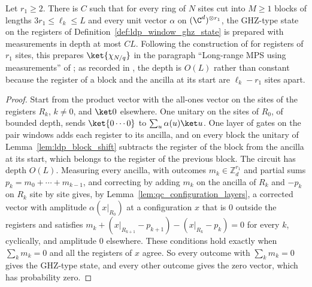 \begin{lemma}
    \label{thm:ldp_window_ghz_measurement}
    \leanok
    Let $r_1\geq2$. There is $C$ such that for every ring of $N$ sites cut into
    $M\geq1$ blocks of lengths $3r_1\leq\ell_k\leq L$ and every unit vector
    $\alpha$ on $(\C^d)^{\otimes r_1}$, the GHZ-type state on the registers of
    Definition~\ref{def:ldp_window_ghz_state} is prepared with measurements in
    depth at most $CL$. Following the construction of
    \cite[Example~1]{Piroli2021LOCC} for registers of $r_1$ sites, this prepares
    $\ket{\chi_{N/q}}$ in the paragraph ``Long-range MPS using measurements'' of
    \cite{Malz2024Preparation}; as recorded in
    \cite{gap:mswc24_measurement_preparation_scope}, the depth is $O(L)$ rather
    than constant because the register of a block and the ancilla at its start
    are $\ell_k-r_1$ sites apart.
\end{lemma}
\begin{proof}
    \leanok
    Start from the product vector with the all-ones vector on the sites of the
    registers $R_k$, $k\neq0$, and $\ket0$ elsewhere. One unitary on the sites
    of $R_0$, of bounded depth, sends $\ket{0\cdots0}$ to $\sum_u\alpha(u)\ket u$.
    One layer of gates on the pair windows adds each register to its ancilla,
    and on every block the unitary of Lemma~\ref{lem:ldp_block_shift} subtracts
    the register of the block from the ancilla at its start, which belongs to the
    register of the previous block. The circuit has depth $O(L)$. Measuring every
    ancilla, with outcomes $m_k\in\mathbb Z_d^{r_1}$ and partial sums
    $p_k=m_0+\cdots+m_{k-1}$, and correcting by adding $m_k$ on the ancilla of $R_k$ and
    $-p_k$ on $R_k$ site by site gives, by Lemma~\ref{lem:qc_configuration_layers},
    a corrected vector with amplitude $\alpha(x|_{R_0})$ at a
    configuration $x$ that is $0$ outside the registers and satisfies
    $m_k+(x|_{R_{k+1}}-p_{k+1})-(x|_{R_k}-p_k)=0$ for every $k$, cyclically, and
    amplitude $0$ elsewhere. These conditions hold exactly when
    $\sum_km_k=0$ and all the registers of $x$ agree. So every outcome with
    $\sum_km_k=0$ gives the GHZ-type state, and every other outcome gives the
    zero vector, which has probability zero.
\end{proof}


